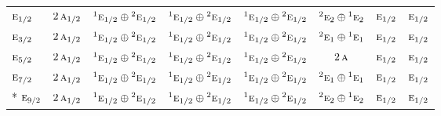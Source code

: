 \documentclass[10pt,a4paper]{article}
\numberwithin{equation}{section}
\newcommand{\irr}[1]{\text{\normalfont\scshape #1}}
\newcommand{\conjpair}[1]{{}^{#1}}
\begin{document}
{\begin{longtable}{@{}lccccccc@{}}
$\irr{e}_{1/2}$ & $2\,\irr{a}_{1/2}$ & $\conjpair{1}\irr{e}_{1/2}\oplus \conjpair{2}\irr{e}_{1/2}$ & $\conjpair{1}\irr{e}_{1/2}\oplus \conjpair{2}\irr{e}_{1/2}$ & $\conjpair{1}\irr{e}_{1/2}\oplus \conjpair{2}\irr{e}_{1/2}$ & $\conjpair{2}\irr{e}_{2}\oplus \conjpair{1}\irr{e}_{2}$ & $\irr{e}_{1/2}$ & $\irr{e}_{1/2}$\\
$\irr{e}_{3/2}$ & $2\,\irr{a}_{1/2}$ & $\conjpair{1}\irr{e}_{1/2}\oplus \conjpair{2}\irr{e}_{1/2}$ & $\conjpair{1}\irr{e}_{1/2}\oplus \conjpair{2}\irr{e}_{1/2}$ & $\conjpair{1}\irr{e}_{1/2}\oplus \conjpair{2}\irr{e}_{1/2}$ & $\conjpair{2}\irr{e}_{1}\oplus \conjpair{1}\irr{e}_{1}$ & $\irr{e}_{1/2}$ & $\irr{e}_{1/2}$\\
$\irr{e}_{5/2}$ & $2\,\irr{a}_{1/2}$ & $\conjpair{1}\irr{e}_{1/2}\oplus \conjpair{2}\irr{e}_{1/2}$ & $\conjpair{1}\irr{e}_{1/2}\oplus \conjpair{2}\irr{e}_{1/2}$ & $\conjpair{1}\irr{e}_{1/2}\oplus \conjpair{2}\irr{e}_{1/2}$ & $2\,\irr{a}$ & $\irr{e}_{1/2}$ & $\irr{e}_{1/2}$\\
$\irr{e}_{7/2}$ & $2\,\irr{a}_{1/2}$ & $\conjpair{1}\irr{e}_{1/2}\oplus \conjpair{2}\irr{e}_{1/2}$ & $\conjpair{1}\irr{e}_{1/2}\oplus \conjpair{2}\irr{e}_{1/2}$ & $\conjpair{1}\irr{e}_{1/2}\oplus \conjpair{2}\irr{e}_{1/2}$ & $\conjpair{2}\irr{e}_{1}\oplus \conjpair{1}\irr{e}_{1}$ & $\irr{e}_{1/2}$ & $\irr{e}_{1/2}$\\*
$\irr{e}_{9/2}$ & $2\,\irr{a}_{1/2}$ & $\conjpair{1}\irr{e}_{1/2}\oplus \conjpair{2}\irr{e}_{1/2}$ & $\conjpair{1}\irr{e}_{1/2}\oplus \conjpair{2}\irr{e}_{1/2}$ & $\conjpair{1}\irr{e}_{1/2}\oplus \conjpair{2}\irr{e}_{1/2}$ & $\conjpair{2}\irr{e}_{2}\oplus \conjpair{1}\irr{e}_{2}$ & $\irr{e}_{1/2}$ & $\irr{e}_{1/2}$\\
\bottomrule\end{longtable}}
\end{document}
